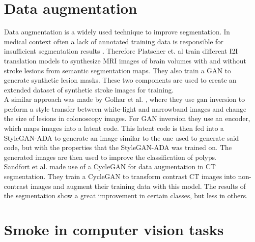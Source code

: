 \section{Data augmentation}
Data augmentation is a widely used technique to improve segmentation.
In medical context often a lack of annotated training data is responsible for insufficient segmentation results \cite{maier2022surgical}.
Therefore Platscher et. al \cite{platscher2022image} train different I2I translation models to synthesize MRI images of brain volumes with and without stroke lesions from semantic segmentation maps.
They also train a GAN to generate synthetic lesion masks. These two components are used to create an extended dataset of synthetic stroke images for training.\\
A similar approach was made by Golhar et al. \cite{golhar2022gan}, where they use gan inversion to perform a style transfer between white-light and narrowband images and change the size of lesions in colonoscopy images.
For GAN inversion they use an encoder, which maps images into a latent code.
This latent code is then fed into a StyleGAN-ADA to generate an image similar to the one used to generate said code, but with the properties that the StyleGAN-ADA was trained on.
The generated images are then used to improve the classification of polyps.\\
Sandfort et al. \cite{sandfort2019data} made use of a CycleGAN for data augmentation in CT segmentation.
They train a CycleGAN to transform contrast CT images into non-contrast images and augment their training data with this model.
The results of the segmentation show a great improvement in certain classes, but less in others.\\

\section{Smoke in computer vision tasks}
